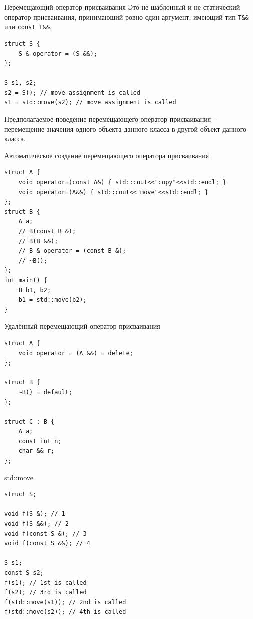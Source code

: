 \documentclass[unknownkeysallowed,xcolor=table]{beamer}
\begin{document}
\begin{frame}[fragile]{Перемещающий оператор присваивания}
Это не шаблонный и не статический оператор присваивания, принимающий ровно один аргумент, имеющий тип \lstinline{T&&} или \lstinline{const T&&}.

\vspace{1em}

\begin{lstlisting}
struct S {
    S & operator = (S &&);
};

S s1, s2;
s2 = S(); // move assignment is called
s1 = std::move(s2); // move assignment is called

\end{lstlisting}
\vspace{1em}

Предполагаемое поведение перемещающего оператор присваивания -- перемещение значения одного объекта данного класса в другой объект данного класса.
\end{frame}

\begin{frame}[fragile]{Автоматическое создание перемещающего оператора присваивания}
\begin{lstlisting}
struct A {
    void operator=(const A&) { std::cout<<"copy"<<std::endl; }
    void operator=(A&&) { std::cout<<"move"<<std::endl; }
};
struct B {
    A a;
    // B(const B &);
    // B(B &&);
    // B & operator = (const B &);
    // ~B();
};
int main() {
    B b1, b2;
    b1 = std::move(b2);
}
\end{lstlisting}
\end{frame}

\begin{frame}[fragile]{Удалённый перемещающий оператор присваивания}
\begin{lstlisting}
struct A {
    void operator = (A &&) = delete;
};

struct B {
    ~B() = default;
};

struct C : B {
    A a;
    const int n;
    char && r;
};
\end{lstlisting}
\end{frame}

\begin{frame}[fragile]{std::move}
\begin{lstlisting}
struct S;

void f(S &); // 1
void f(S &&); // 2
void f(const S &); // 3
void f(const S &&); // 4

S s1;
const S s2;
f(s1); // 1st is called
f(s2); // 3rd is called
f(std::move(s1)); // 2nd is called
f(std::move(s2)); // 4th is called
\end{lstlisting}
\end{frame}
\end{document}
